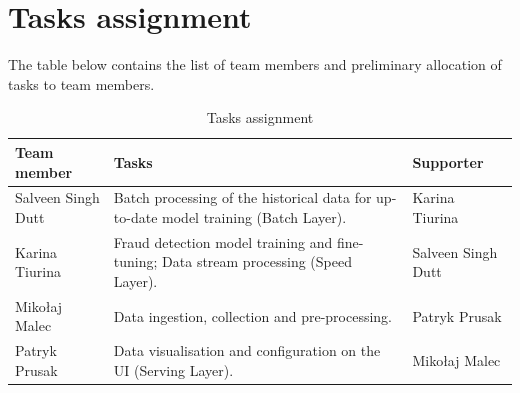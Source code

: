 \documentclass[12pt,a4paper, hidelinks]{article}
\begin{document}
\newpage

\section{Tasks assignment}

The table below contains the list of team members and preliminary allocation of tasks to team members.

\begin{table}[htbp]
\centering
\begin{tabular}{|p{4cm}|p{6cm}|p{4cm}|}
\hline
\textbf{Team member} & \textbf{Tasks} & \textbf{Supporter} \\
\hline
Salveen Singh Dutt & Batch processing of the historical data for up-to-date model training (Batch Layer). & Karina Tiurina \\
\hline
Karina Tiurina & Fraud detection model training and fine-tuning; Data stream processing (Speed Layer). & Salveen Singh Dutt \\
\hline
Mikołaj Malec & Data ingestion, collection and pre-processing. & Patryk Prusak  \\
\hline
Patryk Prusak & Data visualisation and configuration on the UI (Serving Layer). & Mikołaj Malec \\
\hline
\end{tabular}
\caption{Tasks assignment}
\end{table}
\end{document}
